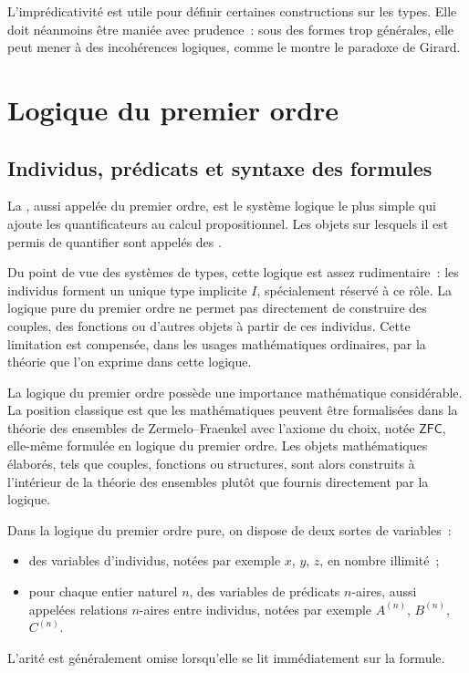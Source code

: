 \thingy
L'imprédicativité est utile pour définir certaines constructions sur les
types.  Elle doit néanmoins être maniée avec prudence : sous des formes
trop générales, elle peut mener à des incohérences logiques, comme le
montre le paradoxe de Girard.


\section{Logique du premier ordre}

\subsection{Individus, prédicats et syntaxe des formules}

\thingy
La , aussi appelée  du premier ordre, est le système logique le plus simple qui
ajoute les quantificateurs au calcul propositionnel.  Les objets sur
lesquels il est permis de quantifier sont appelés des .

Du point de vue des systèmes de types, cette logique est assez
rudimentaire : les individus forment un unique type implicite $I$,
spécialement réservé à ce rôle.  La logique pure du premier ordre ne
permet pas directement de construire des couples, des fonctions ou
d'autres objets à partir de ces individus.  Cette limitation est
compensée, dans les usages mathématiques ordinaires, par la théorie que
l'on exprime dans cette logique.

\thingy
La logique du premier ordre possède une importance mathématique
considérable.  La position classique est que les mathématiques peuvent
être formalisées dans la théorie des ensembles de Zermelo--Fraenkel avec
l'axiome du choix, notée $\mathsf{ZFC}$, elle-même formulée en logique
du premier ordre.  Les objets mathématiques élaborés, tels que couples,
fonctions ou structures, sont alors construits à l'intérieur de la
théorie des ensembles plutôt que fournis directement par la logique.

\thingy
Dans la logique du premier ordre pure, on dispose de deux sortes de
variables :
\begin{itemize}
\item des variables d'individus, notées par exemple $x$, $y$, $z$,
  en nombre illimité ;
\item pour chaque entier naturel $n$, des variables de prédicats
  $n$-aires, aussi appelées relations $n$-aires entre individus, notées
  par exemple $A^{(n)}$, $B^{(n)}$, $C^{(n)}$.
\end{itemize}
L'arité est généralement omise lorsqu'elle se lit immédiatement sur la
formule.


